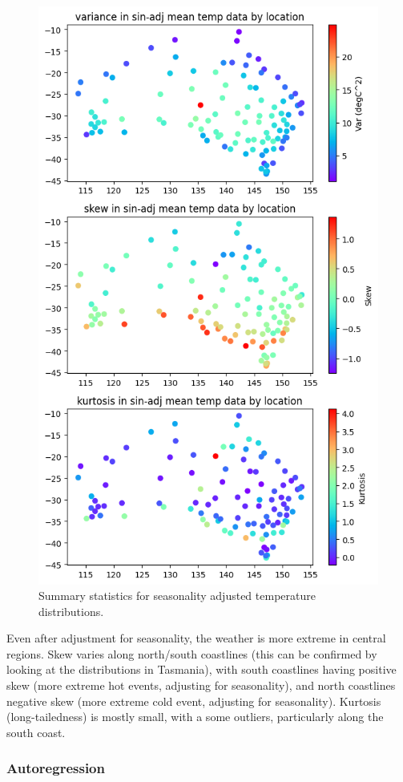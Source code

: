 \documentclass[12pt,a4paper]{article} %
\begin{document}
\begin{figure}[!ht]
    \centering
    \includegraphics[width=0.6\linewidth]{mean_dists_by_loc.png}
    \caption{Summary statistics for seasonality adjusted temperature distributions.}
    \label{fig:dists_by_loc}
\end{figure}

Even after adjustment for seasonality, the weather is more extreme in central regions. Skew varies along north/south coastlines (this can be confirmed by looking at the distributions in Tasmania), with south coastlines having positive skew (more extreme hot events, adjusting for seasonality), and north coastlines negative skew (more extreme cold event, adjusting for seasonality). Kurtosis (long-tailedness) is mostly small, with a some outliers, particularly along the south coast.

\subsubsection{Autoregression}
\label{subsec:autoregression}
\end{document}
